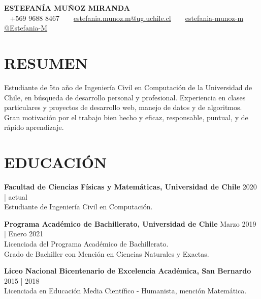\documentclass[a4paper, 10pt]{extarticle}
\begin{document}
\pagestyle{empty}

\begin{center}
\textbf{\LARGE ESTEFANÍA MUÑOZ MIRANDA}\\[5pt] %
\vspace{5pt}
\faPhone ~ +569 9688 8467 ~
\faEnvelope  ~
\href{mailto:estefania.munoz.m@ug.uchile.cl}{estefania.munoz.m@ug.uchile.cl}  ~
\faLinkedin  ~
\href{https://www.linkedin.com/in/estefania-munoz-m/}{estefania-munoz-m} ~
\faGithub  ~
\href{https://github.com/Estefania-M}{@Estefania-M} ~
\end{center}

\section*{RESUMEN}
Estudiante de 5to año de Ingeniería Civil en Computación de la Universidad de Chile, en búsqueda de desarrollo personal y profesional. Experiencia en clases particulares y proyectos de desarrollo web, manejo de datos y de algoritmos. Gran motivación por el trabajo bien hecho y eficaz, responsable, puntual, y de rápido aprendizaje.

\section*{EDUCACIÓN}
\noindent
\textbf{Facultad de Ciencias Físicas y Matemáticas, Universidad de Chile} \hfill 2020 | actual\\ %
Estudiante de Ingeniería Civil en Computación. 

\noindent
\textbf{Programa Académico de Bachillerato, Universidad de Chile} \hfill Marzo 2019 | Enero 2021\\ %
Licenciada del Programa Académico de Bachillerato.\\
Grado de Bachiller con Mención en Ciencias Naturales y Exactas.

\noindent
\textbf{Liceo Nacional Bicentenario de Excelencia Académica, San Bernardo} \hfill 2015 | 2018\\ %
Licenciada en Educación Media Científico - Humanista, mención Matemática.
\end{document}
